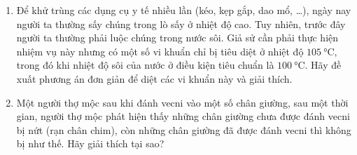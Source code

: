 \begin{enumerate}[label=\bfseries Câu \arabic*:,leftmargin=1.7cm]
{	}
	
	\item Để khử trùng các dụng cụ y tế nhiều lần (kéo, kẹp gắp, dao mổ, \dots), ngày nay người ta thường sấy chúng trong lò sấy ở nhiệt độ cao. Tuy nhiên, trước đây người ta thường phải luộc chúng trong nước sôi. Giả sử cần phải thực hiện nhiệm vụ này nhưng có một số vi khuẩn chỉ bị tiêu diệt ở nhiệt độ $\SI{105}{\celsius}$, trong đó khi nhiệt độ sôi của nước ở điều kiện tiêu chuẩn là $\SI{100}{\celsius}$. Hãy đề xuất phương án đơn giản để diệt các vi khuẩn này và giải thích.
	
	
	\item Một người thợ mộc sau khi đánh vecni vào một số chân giường, sau một thời gian, người thợ mộc phát hiện thấy những chân giường chưa được đánh vecni bị nứt (rạn chân chim), còn những chân giường đã được đánh vecni thì không bị như thế. Hãy giải thích tại sao?
\end{enumerate}

















